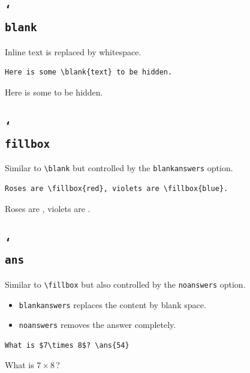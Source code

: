 \documentclass{article}
\theoremstyle{break}
\newtheorem{exercise}[theorem]{\exercisename}
\newcommand{\vbs}{\char`\\}
\begin{document}
\subsection{\tt\vbs blank}
Inline text is replaced by whitespace.

\begin{Verbatim}[frame=single]
Here is some \blank{text} to be hidden.
\end{Verbatim}
Here is some  to be hidden.


\subsection{\tt\vbs fillbox}
Similar to \verb+\blank+ but controlled by the \verb+blankanswers+ option.

\begin{Verbatim}[frame=single]
Roses are \fillbox{red}, violets are \fillbox{blue}.
\end{Verbatim}
Roses are , violets are .

\subsection{\tt\vbs ans}
Similar to \verb+\fillbox+ but also controlled by the \verb+noanswers+ option.
\begin{itemize}
\item {\tt blankanswers} replaces the content by blank space. 
\item {\tt noanswers} removes the answer completely.
\end{itemize}

\begin{Verbatim}[frame=single]
What is $7\times 8$? \ans{54}
\end{Verbatim}
What is $7\times 8$\,? 

%
\end{document}
